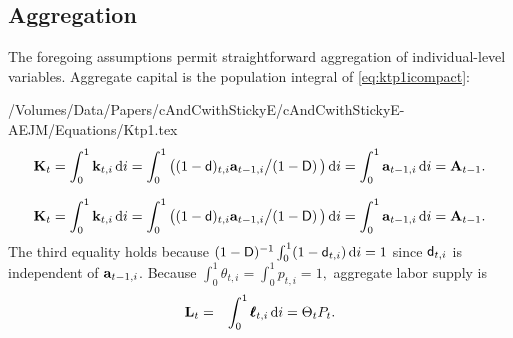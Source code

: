 \documentclass[titlepage]{./econtex}
\begin{document}
\subsection{Aggregation}

The foregoing assumptions permit straightforward aggregation of individual-level variables.  Aggregate capital is the population integral of \eqref{eq:ktp1icompact}:
\begin{verbatimwrite}{/Volumes/Data/Papers/cAndCwithStickyE/cAndCwithStickyE-AEJM/Equations/Ktp1.tex}
\begin{equation*}
\mathbf{K}_{t} = \int_{0}^{1} \mathbf{k}_{t,i}\,\text{d}i = \int_{0}^{1} \big((1-\mathsf{d})_{t,i}\mathbf{a}_{t-1,i} \big/(1-\mathsf{D})\, \big)\,\text{d}i = \int_{0}^{1} \mathbf{a}_{t-1,i}\,\text{d}i = \mathbf{A}_{t-1}.   \label{eq:Ktp1}
\end{equation*}
\end{verbatimwrite}
\begin{equation*}
\mathbf{K}_{t} = \int_{0}^{1} \mathbf{k}_{t,i}\,\text{d}i = \int_{0}^{1} \big((1-\mathsf{d})_{t,i}\mathbf{a}_{t-1,i} \big/(1-\mathsf{D})\, \big)\,\text{d}i = \int_{0}^{1} \mathbf{a}_{t-1,i}\,\text{d}i = \mathbf{A}_{t-1}.   \label{eq:Ktp1}
\end{equation*}
 The third equality holds because $(1-\mathsf{D})^{-1}\int_{0}^{1}(1-\mathsf{d}_{t,i})\,\text{d}i = 1$
since $\mathsf{d}_{t,i}$ is independent of $\mathbf{a}_{t-1,i}$.
Because $\int_{0}^{1} \theta_{t,i} = \int_{0}^{1} {p}_{t,i} = 1,$ aggregate labor supply
is
\begin{eqnarray*}
  \label{eq:Lt}
  \mathbf{L}_{t} & = & \int_{0}^{1} \pmb{\ell}_{t,i}\,\text{d}i = \Theta_{t} {P}_{t}.
\end{eqnarray*}
\end{document}

